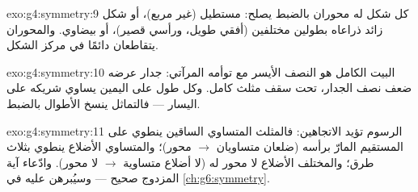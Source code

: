 \begin{solution}{exo:g4:symmetry:9}
كل شكل له محوران بالضبط يصلح: مستطيل (غير مربع)، أو
شكل زائد ذراعاه بطولين مختلفين (أفقي طويل، ورأسي
قصير)، أو بيضاوي. والمحوران يتقاطعان دائمًا في مركز
الشكل.
\end{solution}

\begin{solution}{exo:g4:symmetry:10}
البيت الكامل هو النصف الأيسر مع توأمه المرآتي: جدار
عرضه ضعف نصف الجدار، تحت سقف مثلث كامل. وكل
طول على اليمين يساوي شريكه على اليسار --- فالتماثل
ينسخ الأطوال بالضبط.
\end{solution}

\begin{solution}{exo:g4:symmetry:11}
الرسوم تؤيد الاتجاهين: فالمثلث المتساوي الساقين ينطوي
على المستقيم المارّ برأسه (ضلعان متساويان $\to$ محور)؛ والمتساوي
الأضلاع ينطوي بثلاث طرق؛ والمختلف الأضلاع لا محور له (لا
أضلاع متساوية $\to$ لا محور). وادّعاء آية المزدوج صحيح --- وسيُبرهن
عليه في \cref{ch:g6:symmetry}.
\end{solution}
